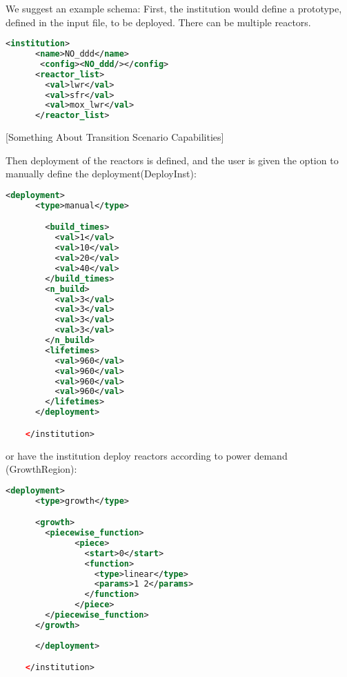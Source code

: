 \documentclass[12pt,letterpaper]{article}
\begin{document}
We suggest an example schema:
First, the institution would define a prototype, defined in the input file,
to be deployed. There can be multiple reactors.
\begin{lstlisting}[language=XML, caption=One-reactor fleet institution input schema]
<institution>
      <name>NO_ddd</name>
       <config><NO_ddd/></config>
      <reactor_list>
        <val>lwr</val>
        <val>sfr</val>
        <val>mox_lwr</val>
      </reactor_list>
\end{lstlisting}

[Something About Transition Scenario Capabilities]

Then deployment of the reactors is defined, and the user
is given the option to manually define the deployment(DeployInst):
\begin{lstlisting}[language=XML, caption=Reactor deployment input schema]
      <deployment>
      <type>manual</type>

        <build_times>
          <val>1</val>
          <val>10</val>
          <val>20</val>
          <val>40</val>
        </build_times>
        <n_build>
          <val>3</val>
          <val>3</val>
          <val>3</val>
          <val>3</val>
        </n_build>
        <lifetimes>
          <val>960</val>
          <val>960</val>
          <val>960</val>
          <val>960</val>
        </lifetimes>
      </deployment>

    </institution>
\end{lstlisting}

or have the institution
deploy reactors according to power demand (GrowthRegion):

\begin{lstlisting}[language=XML, caption=Reactor deployment input schema]
      <deployment>
      <type>growth</type>

      <growth>
        <piecewise_function>
              <piece>
                <start>0</start>
                <function>
                  <type>linear</type>
                  <params>1 2</params>
                </function>
              </piece>
        </piecewise_function>
      </growth>
      
      </deployment>

    </institution>
\end{lstlisting}
\end{document}

